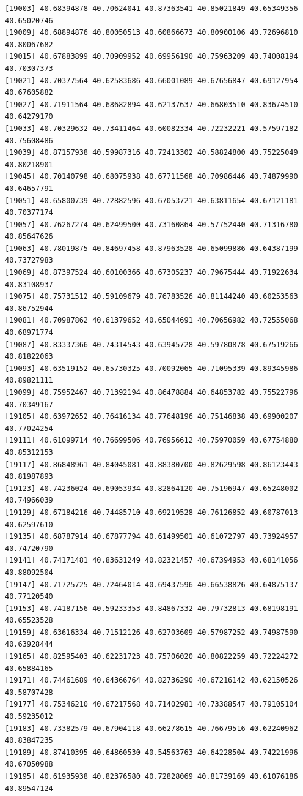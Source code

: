 \documentclass[
  letterpaper,
  DIV=11,
  numbers=noendperiod]{scrartcl}
\begin{document}
\begin{verbatim}
[19003] 40.68394878 40.70624041 40.87363541 40.85021849 40.65349356 40.65020746
[19009] 40.68894876 40.80050513 40.60866673 40.80900106 40.72696810 40.80067682
[19015] 40.67883899 40.70909952 40.69956190 40.75963209 40.74008194 40.70307373
[19021] 40.70377564 40.62583686 40.66001089 40.67656847 40.69127954 40.67605882
[19027] 40.71911564 40.68682894 40.62137637 40.66803510 40.83674510 40.64279170
[19033] 40.70329632 40.73411464 40.60082334 40.72232221 40.57597182 40.75608486
[19039] 40.87157938 40.59987316 40.72413302 40.58824800 40.75225049 40.80218901
[19045] 40.70140798 40.68075938 40.67711568 40.70986446 40.74879990 40.64657791
[19051] 40.65800739 40.72882596 40.67053721 40.63811654 40.67121181 40.70377174
[19057] 40.76267274 40.62499500 40.73160864 40.57752440 40.71316780 40.85647626
[19063] 40.78019875 40.84697458 40.87963528 40.65099886 40.64387199 40.73727983
[19069] 40.87397524 40.60100366 40.67305237 40.79675444 40.71922634 40.83108937
[19075] 40.75731512 40.59109679 40.76783526 40.81144240 40.60253563 40.86752944
[19081] 40.70987862 40.61379652 40.65044691 40.70656982 40.72555068 40.68971774
[19087] 40.83337366 40.74314543 40.63945728 40.59780878 40.67519266 40.81822063
[19093] 40.63519152 40.65730325 40.70092065 40.71095339 40.89345986 40.89821111
[19099] 40.75952467 40.71392194 40.86478884 40.64853782 40.75522796 40.70349167
[19105] 40.63972652 40.76416134 40.77648196 40.75146838 40.69900207 40.77024254
[19111] 40.61099714 40.76699506 40.76956612 40.75970059 40.67754880 40.85312153
[19117] 40.86848961 40.84045081 40.88380700 40.82629598 40.86123443 40.81987893
[19123] 40.74236024 40.69053934 40.82864120 40.75196947 40.65248002 40.74966039
[19129] 40.67184216 40.74485710 40.69219528 40.76126852 40.60787013 40.62597610
[19135] 40.68787914 40.67877794 40.61499501 40.61072797 40.73924957 40.74720790
[19141] 40.74171481 40.83631249 40.82321457 40.67394953 40.68141056 40.88092504
[19147] 40.71725725 40.72464014 40.69437596 40.66538826 40.64875137 40.77120540
[19153] 40.74187156 40.59233353 40.84867332 40.79732813 40.68198191 40.65523528
[19159] 40.63616334 40.71512126 40.62703609 40.57987252 40.74987590 40.63928444
[19165] 40.82595403 40.62231723 40.75706020 40.80822259 40.72224272 40.65884165
[19171] 40.74461689 40.64366764 40.82736290 40.67216142 40.62150526 40.58707428
[19177] 40.75346210 40.67217568 40.71402981 40.73388547 40.79105104 40.59235012
[19183] 40.73382579 40.67904118 40.66278615 40.76679516 40.62240962 40.83847235
[19189] 40.87410395 40.64860530 40.54563763 40.64228504 40.74221996 40.67050988
[19195] 40.61935938 40.82376580 40.72828069 40.81739169 40.61076186 40.89547124

\end{verbatim}
\end{document}

